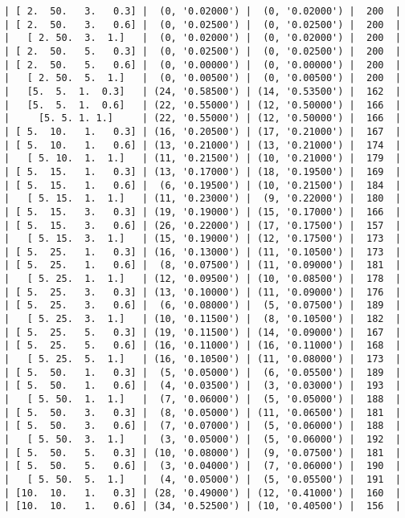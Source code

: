 \documentclass{article}
\begin{document}
\begin{verbatim}
| [ 2.  50.   3.   0.3] |  (0, '0.02000') |  (0, '0.02000') |  200  |
| [ 2.  50.   3.   0.6] |  (0, '0.02500') |  (0, '0.02500') |  200  |
|   [ 2. 50.  3.  1.]   |  (0, '0.02000') |  (0, '0.02000') |  200  |
| [ 2.  50.   5.   0.3] |  (0, '0.02500') |  (0, '0.02500') |  200  |
| [ 2.  50.   5.   0.6] |  (0, '0.00000') |  (0, '0.00000') |  200  |
|   [ 2. 50.  5.  1.]   |  (0, '0.00500') |  (0, '0.00500') |  200  |
|   [5.  5.  1.  0.3]   | (24, '0.58500') | (14, '0.53500') |  162  |
|   [5.  5.  1.  0.6]   | (22, '0.55000') | (12, '0.50000') |  166  |
|     [5. 5. 1. 1.]     | (22, '0.55000') | (12, '0.50000') |  166  |
| [ 5.  10.   1.   0.3] | (16, '0.20500') | (17, '0.21000') |  167  |
| [ 5.  10.   1.   0.6] | (13, '0.21000') | (13, '0.21000') |  174  |
|   [ 5. 10.  1.  1.]   | (11, '0.21500') | (10, '0.21000') |  179  |
| [ 5.  15.   1.   0.3] | (13, '0.17000') | (18, '0.19500') |  169  |
| [ 5.  15.   1.   0.6] |  (6, '0.19500') | (10, '0.21500') |  184  |
|   [ 5. 15.  1.  1.]   | (11, '0.23000') |  (9, '0.22000') |  180  |
| [ 5.  15.   3.   0.3] | (19, '0.19000') | (15, '0.17000') |  166  |
| [ 5.  15.   3.   0.6] | (26, '0.22000') | (17, '0.17500') |  157  |
|   [ 5. 15.  3.  1.]   | (15, '0.19000') | (12, '0.17500') |  173  |
| [ 5.  25.   1.   0.3] | (16, '0.13000') | (11, '0.10500') |  173  |
| [ 5.  25.   1.   0.6] |  (8, '0.07500') | (11, '0.09000') |  181  |
|   [ 5. 25.  1.  1.]   | (12, '0.09500') | (10, '0.08500') |  178  |
| [ 5.  25.   3.   0.3] | (13, '0.10000') | (11, '0.09000') |  176  |
| [ 5.  25.   3.   0.6] |  (6, '0.08000') |  (5, '0.07500') |  189  |
|   [ 5. 25.  3.  1.]   | (10, '0.11500') |  (8, '0.10500') |  182  |
| [ 5.  25.   5.   0.3] | (19, '0.11500') | (14, '0.09000') |  167  |
| [ 5.  25.   5.   0.6] | (16, '0.11000') | (16, '0.11000') |  168  |
|   [ 5. 25.  5.  1.]   | (16, '0.10500') | (11, '0.08000') |  173  |
| [ 5.  50.   1.   0.3] |  (5, '0.05000') |  (6, '0.05500') |  189  |
| [ 5.  50.   1.   0.6] |  (4, '0.03500') |  (3, '0.03000') |  193  |
|   [ 5. 50.  1.  1.]   |  (7, '0.06000') |  (5, '0.05000') |  188  |
| [ 5.  50.   3.   0.3] |  (8, '0.05000') | (11, '0.06500') |  181  |
| [ 5.  50.   3.   0.6] |  (7, '0.07000') |  (5, '0.06000') |  188  |
|   [ 5. 50.  3.  1.]   |  (3, '0.05000') |  (5, '0.06000') |  192  |
| [ 5.  50.   5.   0.3] | (10, '0.08000') |  (9, '0.07500') |  181  |
| [ 5.  50.   5.   0.6] |  (3, '0.04000') |  (7, '0.06000') |  190  |
|   [ 5. 50.  5.  1.]   |  (4, '0.05000') |  (5, '0.05500') |  191  |
| [10.  10.   1.   0.3] | (28, '0.49000') | (12, '0.41000') |  160  |
| [10.  10.   1.   0.6] | (34, '0.52500') | (10, '0.40500') |  156  |

\end{verbatim}
\end{document}
